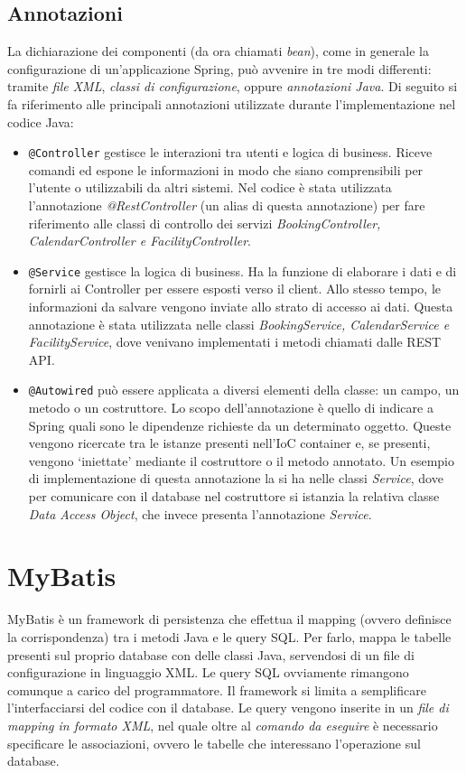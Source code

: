 \subsection{Annotazioni}
La dichiarazione dei componenti (da ora chiamati \emph{bean}), come in generale la configurazione di un’applicazione Spring, può avvenire in tre modi differenti: tramite \textit{file XML}, \textit{classi di configurazione}, oppure \textit{annotazioni Java}. Di seguito si fa riferimento alle principali annotazioni utilizzate durante l'implementazione nel codice Java:
\begin{itemize} 
    \item \texttt{@Controller} gestisce le interazioni tra utenti e logica di business. Riceve comandi ed espone le informazioni in modo che siano comprensibili per l’utente o utilizzabili da altri sistemi. Nel codice è stata utilizzata l'annotazione \emph{@RestController} (un alias di questa annotazione) per fare riferimento alle classi di controllo dei servizi \textit{BookingController, CalendarController e FacilityController}.
    \item \texttt{@Service} gestisce la logica di business. Ha la funzione di elaborare i dati e di fornirli ai Controller per essere esposti verso il client. Allo stesso tempo, le informazioni da salvare vengono inviate allo strato di accesso ai dati. Questa annotazione è stata utilizzata nelle classi \textit{BookingService, CalendarService e FacilityService}, dove venivano implementati i metodi chiamati dalle REST API.
    \item \texttt{@Autowired} può essere applicata a diversi elementi della classe: un campo, un metodo o un costruttore. Lo scopo dell'annotazione è quello di indicare a Spring quali sono le dipendenze richieste da un determinato oggetto. Queste vengono ricercate tra le istanze presenti nell'IoC container e, se presenti, vengono `iniettate' mediante il costruttore o il metodo annotato. Un esempio di implementazione di questa annotazione la si ha nelle classi \emph{Service}, dove per comunicare con il database nel costruttore si istanzia la relativa classe \textit{Data Access Object}, che invece presenta l'annotazione \emph{Service}.
\end{itemize}

\section{MyBatis}
MyBatis è un framework di persistenza che effettua il mapping (ovvero definisce la corrispondenza) tra i metodi Java e le query SQL. Per farlo, mappa le tabelle presenti sul proprio database con delle classi Java, servendosi di un file di configurazione in linguaggio XML. Le query SQL ovviamente rimangono comunque a carico del programmatore. Il framework si limita a semplificare l’interfacciarsi del codice con il database. Le query vengono inserite in un \emph{file di mapping in formato XML}, nel quale oltre al \textit{comando da eseguire} è necessario specificare le associazioni, ovvero le tabelle che interessano l'operazione sul database.

